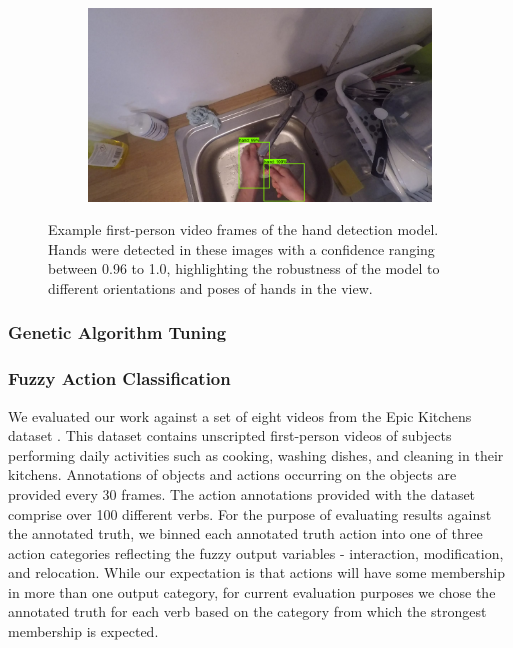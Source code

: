 \documentclass[12pt]{report}
\begin{document}
\begin{figure}[t]
\begin{subfigure}{.5\textwidth}
\label{handsC}
\end{subfigure}
\begin{subfigure}{.5\textwidth}
\centerline{\includegraphics[width=.95\linewidth]{figure/handEval4.png}}
\label{handsD}
\end{subfigure}
\caption{Example first-person video frames of the hand detection model. Hands were detected in these images with a confidence ranging between 0.96 to 1.0, highlighting the robustness of the model to different orientations and poses of hands in the view.}
\label{sampleFrame}
\end{figure}


\subsubsection{Genetic Algorithm Tuning}


\subsubsection{Fuzzy Action Classification}

We evaluated our work against a set of eight videos from the Epic Kitchens dataset \cite{Damen2018ScalingDataset}. This dataset contains unscripted first-person videos of subjects performing daily activities such as cooking, washing dishes, and cleaning in their kitchens. Annotations of objects and actions occurring on the objects are provided every 30 frames. The action annotations provided with the dataset comprise over 100 different verbs. For the purpose of evaluating results against the annotated truth, we binned each annotated truth action into one of three action categories reflecting the fuzzy output variables - interaction, modification, and relocation. While our expectation is that actions will have some membership in more than one output category, for current evaluation purposes we chose the annotated truth for each verb based on the category from which the strongest membership is expected. 
\end{document}
